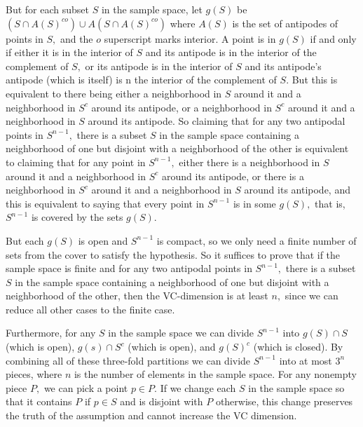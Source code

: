 \documentclass[12pt]{amsart}
\newcommand{\0}{\mat{0}}
\newcommand{\1}{\mathds{1}}
\begin{document}
But for each subset $S$ in the sample space, let $g(S)$ be $(S \cap A(S)^{co}) \cup A(S \cap A(S)^{co})$ where $A(S)$ is the set of antipodes of points in $S,$ and the $o$ superscript marks interior. A point is in $g(S)$ if and only if either it is in the interior of $S$ and its antipode is in the interior of the complement of $S,$ or its antipode is in the interior of $S$ and its antipode's antipode (which is itself) is n the interior of the complement of $S.$ But this is equivalent to there being either a neighborhood in $S$ around it and a neighborhood in $S^c$ around its antipode, or a neighborhood in $S^c$ around it and a neighborhood in $S$ around its antipode. So claiming that for any two antipodal points in $S^{n - 1},$ there is a subset $S$ in the sample space containing a neighborhood of one but disjoint with a neighborhood of the other is equivalent to claiming that for any point in $S^{n - 1},$ either there is a neighborhood in $S$ around it and a neighborhood in $S^c$ around its antipode, or there is a neighborhood in $S^c$ around it and a neighborhood in $S$ around its antipode, and this is equivalent to saying that every point in $S^{n - 1}$ is in some $g(S),$ that is, $S^{n - 1}$ is covered by the sets $g(S).$

But each $g(S)$ is open and $S^{n - 1}$ is compact, so we only need a finite number of sets from the cover to satisfy the hypothesis. So it suffices to prove that if the sample space is finite and for any two antipodal points in $S^{n - 1},$ there is a subset $S$ in the sample space containing a neighborhood of one but disjoint with a neighborhood of the other, then the VC-dimension is at least $n,$ since we can reduce all other cases to the finite case.

Furthermore, for any $S$ in the sample space we can divide $S^{n - 1}$ into $g(S) \cap S$ (which is open), $g(s) \cap S^c$ (which is open), and $g(S)^c$ (which is closed). By combining all of these three-fold partitions we can divide $S^{n - 1}$ into at most $3^n$ pieces, where $n$ is the number of elements in the sample space. For any nonempty piece $P,$ we can pick a point $p \in P.$ If we change each $S$ in the sample space so that it contains $P$ if $p \in S$ and is disjoint with $P$ otherwise, this change preserves the truth of the assumption and cannot increase the VC dimension.
\end{document}
